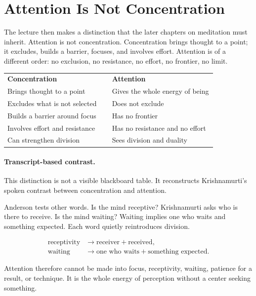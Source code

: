 \documentclass[11pt,oneside]{book}
\begin{document}
\section{Attention Is Not Concentration}

The lecture then makes a distinction that the later chapters on meditation must inherit. Attention is not concentration. Concentration brings thought to a point; it excludes, builds a barrier, focuses, and involves effort. Attention is of a different order: no exclusion, no resistance, no effort, no frontier, no limit.

\begin{table}
\centering
\begin{tabular}{p{0.42\linewidth}p{0.42\linewidth}}
\textbf{Concentration} & \textbf{Attention}\\
Brings thought to a point & Gives the whole energy of being\\
Excludes what is not selected & Does not exclude\\
Builds a barrier around focus & Has no frontier\\
Involves effort and resistance & Has no resistance and no effort\\
Can strengthen division & Sees division and duality
\end{tabular}

\paragraph{Transcript-based contrast.}
This distinction is not a visible blackboard table. It reconstructs Krishnamurti's spoken contrast between concentration and attention.
\end{table}

Anderson tests other words. Is the mind receptive? Krishnamurti asks who is there to receive. Is the mind waiting? Waiting implies one who waits and something expected. Each word quietly reintroduces division.

\begin{align}
\text{receptivity} &\longrightarrow \text{receiver}+\text{received},\\
\text{waiting} &\longrightarrow \text{one who waits}+\text{something expected}.
\end{align}

Attention therefore cannot be made into focus, receptivity, waiting, patience for a result, or technique. It is the whole energy of perception without a center seeking something.
\end{document}
